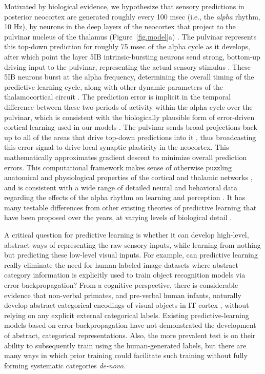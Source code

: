 \documentclass[12pt,twoside]{article}
\newif\myifpdf
\begin{document}
Motivated by biological evidence, we hypothesize that sensory predictions in posterior neocortex are generated roughly every 100 msec (i.e., the {\em alpha} rhythm, 10 Hz), by neurons in the deep layers of the neocortex that project to the pulvinar nucleus of the thalamus (Figure~\ref{fig.model}a) \cite{OReillyWyatteRohrlich14}.  The pulvinar represents this top-down prediction for roughly 75 msec of the alpha cycle as it develops, after which point the layer 5IB intrinsic-bursting neurons send strong, bottom-up driving input to the pulvinar, representing the actual sensory stimulus \cite{ShermanGuillery06}.  These 5IB neurons burst at the alpha frequency, determining the overall timing of the predictive learning cycle, along with other dynamic parameters of the thalamocortical circuit \cite{LorinczKekesiJuhaszEtAl09,FranceschettiGuatteoPanzicaEtAl95,SaalmannPinskWangEtAl12}.  The prediction error is implicit in the temporal difference between these two periods of activity within the alpha cycle over the pulvinar, which is consistent with the biologically plausible form of error-driven cortical learning used in our models \cite{OReilly96}.  The pulvinar sends broad projections back up to all of the areas that drive top-down predictions into it \cite{Shipp03,Mumford91}, thus broadcasting this error signal to drive local synaptic plasticity in the neocortex. This mathematically approximates gradient descent to minimize overall prediction errors.  This computational framework makes sense of otherwise puzzling anatomical and physiological properties of the cortical and thalamic networks \cite{ShermanGuillery06}, and is consistent with a wide range of detailed neural and behavioral data regarding the effects of the alpha rhythm on learning and perception \cite{BuffaloFriesLandmanEtAl11,VanRullenKoch03,JensenBonnefondVanRullen12,FiebelkornKastner19}.  It has many testable differences from other existing theories of predictive learning that have been proposed over the years, at varying levels of biological detail \cite{Mumford92,RaoBallard99,KawatoHayakawaInui93,Friston05}.

A critical question for predictive learning is whether it can develop high-level, abstract ways of representing the raw sensory inputs, while learning from nothing but predicting these low-level visual inputs.  For example, can predictive learning really eliminate the need for human-labeled image datasets where abstract category information is explicitly used to train object recognition models via error-backpropagation?  From a cognitive perspective, there is considerable evidence that non-verbal primates, and pre-verbal human infants, naturally develop abstract categorical encodings of visual objects in IT cortex \cite{CadieuHongYaminsEtAl14}, without relying on any explicit external categorical labels.  Existing predictive-learning models based on error backpropagation \cite{LotterKreimanCox16} have not demonstrated the development of abstract, categorical representations.  Also, the more prevalent test is on their ability to subsequently train using the human-generated labels, but there are many ways in which prior training could facilitate such training without fully forming systematic categories {\em de-novo}.
\end{document}
